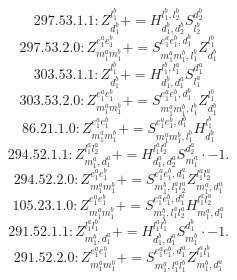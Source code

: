 \documentclass[letterpaper,10pt,fleqn,leqno,onecolumn]{article}
\begin{document}
\begin{equation} \;\;\;\;\;\;  297.53.1.1: Z^{l_{1}^{b}}_{d_{1}^{b}}+=H^{l_{1}^{b},l_{2}^{b}}_{d_{1}^{b},d_{2}^{b}}S^{d_{2}^{b}}_{l_{2}^{b}} \end{equation}
\begin{equation} \;\;\;\;\;\;  297.53.2.0: Z^{e_{1}^{a}e_{1}^{b}}_{m_{1}^{a}m_{1}^{b}}+=S^{e_{1}^{a}e_{1}^{b},d_{1}^{b}}_{m_{1}^{a}m_{1}^{b},l_{1}^{b}}Z^{l_{1}^{b}}_{d_{1}^{b}} \end{equation}
\begin{equation} \;\;\;\;\;\;  303.53.1.1: Z^{l_{1}^{b}}_{d_{1}^{b}}+=H^{l_{1}^{b},l_{1}^{a}}_{d_{1}^{b},d_{1}^{a}}S^{d_{1}^{a}}_{l_{1}^{a}} \end{equation}
\begin{equation} \;\;\;\;\;\;  303.53.2.0: Z^{e_{1}^{a}e_{1}^{b}}_{m_{1}^{a}m_{1}^{b}}+=S^{e_{1}^{a}e_{1}^{b},d_{1}^{b}}_{m_{1}^{a}m_{1}^{b},l_{1}^{b}}Z^{l_{1}^{b}}_{d_{1}^{b}} \end{equation}
\begin{equation} \;\;\;\;\;\;  86.21.1.0: Z^{e_{1}^{a}e_{1}^{b}}_{m_{1}^{a}m_{1}^{b}}+=S^{e_{1}^{a}e_{1}^{b},d_{1}^{b}}_{m_{1}^{a}m_{1}^{b},l_{1}^{b}}H^{l_{1}^{b}}_{d_{1}^{b}} \end{equation}
\begin{equation} \;\;\;\;\;\;  294.52.1.1: Z^{l_{1}^{a}l_{2}^{a}}_{m_{1}^{a},d_{1}^{a}}+=H^{l_{1}^{a}l_{2}^{a}}_{d_{1}^{a},d_{2}^{a}}S^{d_{2}^{a}}_{m_{1}^{a}}\cdot -1. \end{equation}
\begin{equation} \;\;\;\;\;\;  294.52.2.0: Z^{e_{1}^{a}e_{1}^{b}}_{m_{1}^{a}m_{1}^{b}}+=S^{e_{1}^{a}e_{1}^{b},d_{1}^{a}}_{m_{1}^{b},l_{1}^{a}l_{2}^{a}}Z^{l_{1}^{a}l_{2}^{a}}_{m_{1}^{a},d_{1}^{a}} \end{equation}
\begin{equation} \;\;\;\;\;\;  105.23.1.0: Z^{e_{1}^{a}e_{1}^{b}}_{m_{1}^{a}m_{1}^{b}}+=S^{e_{1}^{a}e_{1}^{b},d_{1}^{a}}_{m_{1}^{b},l_{1}^{a}l_{2}^{a}}H^{l_{1}^{a}l_{2}^{a}}_{m_{1}^{a},d_{1}^{a}} \end{equation}
\begin{equation} \;\;\;\;\;\;  291.52.1.1: Z^{l_{1}^{a}l_{1}^{b}}_{m_{1}^{b},d_{1}^{a}}+=H^{l_{1}^{a}l_{1}^{b}}_{d_{1}^{b},d_{1}^{a}}S^{d_{1}^{b}}_{m_{1}^{b}}\cdot -1. \end{equation}
\begin{equation} \;\;\;\;\;\;  291.52.2.0: Z^{e_{1}^{a}e_{1}^{b}}_{m_{1}^{a}m_{1}^{b}}+=S^{e_{1}^{a}e_{1}^{b},d_{1}^{a}}_{m_{1}^{a},l_{1}^{a}l_{1}^{b}}Z^{l_{1}^{a}l_{1}^{b}}_{m_{1}^{b},d_{1}^{a}} \end{equation}
\end{document}
